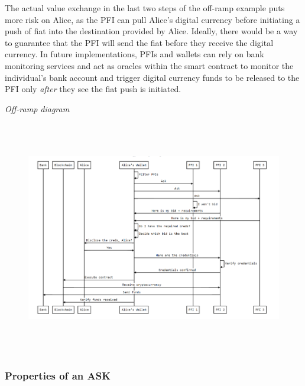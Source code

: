 \documentclass[11pt]{article}
\begin{document}
\vspace{1\baselineskip}
The actual value exchange in the last two steps of the off-ramp example puts more risk on Alice, as the PFI can pull Alice’s digital currency before initiating a push of fiat into the destination provided by Alice. \textcolor[HTML]{202124}{Ideally, there would be a way to guarantee that the PFI will send the fiat before they receive the digital currency.} In future implementations, PFIs and wallets can rely on bank monitoring services and act as oracles within the smart contract to monitor the individual's bank account and trigger digital currency funds to be released to the PFI only \textit{after} they see the fiat push is initiated\textcolor[HTML]{3C4043}{.}

\vspace{9\baselineskip}
\begin{center}
\textit{\textcolor[HTML]{3C4043}{Off-ramp diagram}}
\end{center}


\vspace{1\baselineskip}
\textcolor[HTML]{3C4043}{\begin{figure}[H]
\includegraphics[width=15.48cm,height=10.29cm]{./diagrams/off-ramp.png}
\end{figure}
}

\vspace{1\baselineskip}
\subsubsection{Properties of an ASK}
\end{document}
